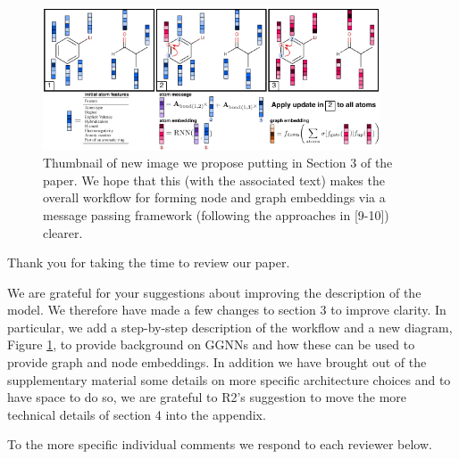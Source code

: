 \documentclass{article}
\begin{document}


\begin{figure}
\centering
  \includegraphics[width=10cm]{graph_nn.pdf}
 \caption{Thumbnail of new image we propose  putting in Section 3 of the paper. We hope that this (with the associated text) makes the overall workflow for forming node and graph embeddings via a message passing framework (following the approaches in [9-10]) clearer.}
 \label{fig:new-diagram}
\end{figure}

Thank you for taking the time to review our paper. 

We are grateful for your suggestions about improving the description of the model. We therefore have made a few changes to section 3 to improve clarity.
In particular, we add a step-by-step description of the workflow and a new diagram, Figure \ref{fig:new-diagram}, to provide background on GGNNs and how these can be used to provide graph and node embeddings. 
In addition we have brought out of the supplementary material some details on more specific architecture choices and to have space to do so, we are grateful to R2's suggestion to move the more technical details of section 4 into the appendix.






To the more specific individual comments we respond to each reviewer below.


\end{document}
